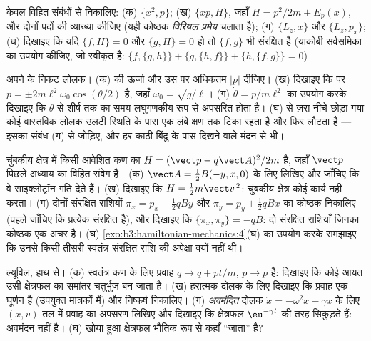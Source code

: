 \begin{exercise}[$\star$]\label{exo:b3:hamiltonian-mechanics:4}
केवल विहित संबंधों से निकालिए: (क) $\{x^2, p\}$; (ख)
$\{xp, H\}$, जहाँ $H = p^2/2m + E_p(x)$, और दोनों पदों की व्याख्या
कीजिए (यही कोष्ठक \emph{विरियल प्रमेय} चलाता है); (ग) $\{L_z, x\}$ और
$\{L_z, p_x\}$; (घ) दिखाइए कि यदि $\{f, H\} = 0$ और $\{g, H\} = 0$ हो
तो $\{f, g\}$ भी संरक्षित है (याकोबी सर्वसमिका का उपयोग कीजिए, जो
स्वीकृत है: $\{f,\{g,h\}\} + \{g,\{h,f\}\} + \{h,\{f,g\}\} = 0$)।
\end{exercise}

\begin{exercise}[$\star\star$]\label{exo:b3:hamiltonian-mechanics:5}
अपने  के निकट लोलक। (क)  की ऊर्जा और उस पर
अधिकतम $|p|$ दीजिए। (ख) दिखाइए कि  पर $p =
\pm 2m\ell^2\omega_0\cos(\theta/2)$ है, जहाँ $\omega_0 = \sqrt{g/\ell}$।
(ग) $\dot\theta = p/m\ell^2$ का उपयोग करके दिखाइए कि $\theta$ से शीर्ष
तक का समय लघुगणकीय रूप से अपसरित होता है। (घ)  से ज़रा
नीचे छोड़ा गया कोई वास्तविक लोलक उलटी स्थिति के पास एक लंबे क्षण तक
टिका रहता है और फिर लौटता है --- इसका संबंध (ग) से जोड़िए, और हर काठी
बिंदु के पास दिखने वाले मंदन से भी।
\end{exercise}

\begin{exercise}[$\star\star$]\label{exo:b3:hamiltonian-mechanics:6}
चुंबकीय क्षेत्र में किसी आवेशित कण का $H = (\vect p -
q\vect A)^2/2m$ है, जहाँ $\vect p$ पिछले अध्याय का विहित संवेग है।
(क) $\vect A = \tfrac12
B(-y, x, 0)$ के लिए  लिखिए और जाँचिए कि वे साइक्लोट्रॉन
गति देते हैं। (ख) दिखाइए कि $H =
\tfrac12 m\vect v^{\,2}$: चुंबकीय क्षेत्र कोई कार्य नहीं करता। (ग)
दोनों संरक्षित राशियों $\pi_x = p_x - \tfrac12
qBy$ और $\pi_y = p_y + \tfrac12 qBx$ का कोष्ठक निकालिए (पहले जाँचिए
कि प्रत्येक संरक्षित है), और दिखाइए कि $\{\pi_x, \pi_y\} = -qB$: दो
संरक्षित राशियाँ जिनका कोष्ठक एक अचर है। (घ)
\cref{exo:b3:hamiltonian-mechanics:4}(घ) का उपयोग करके समझाइए कि उनसे
किसी तीसरी स्वतंत्र संरक्षित राशि की अपेक्षा क्यों नहीं थी।
\end{exercise}

\begin{exercise}[$\star\star$]\label{exo:b3:hamiltonian-mechanics:7}
ल्यूविल, हाथ से। (क) स्वतंत्र कण के लिए प्रवाह $q \to q +
pt/m$, $p \to p$ है: दिखाइए कि कोई आयत उसी क्षेत्रफल का
समांतर चतुर्भुज बन जाता है। (ख) हरात्मक दोलक के लिए दिखाइए कि प्रवाह
एक घूर्णन है (उपयुक्त मात्रकों में) और निष्कर्ष निकालिए। (ग)
\emph{अवमंदित} दोलक $\ddot x = -\omega^2x - \gamma\dot x$ के लिए
$(x, v)$ तल में प्रवाह का अपसरण लिखिए और दिखाइए कि क्षेत्रफल
$\eu^{-\gamma t}$ की तरह सिकुड़ते हैं: अवमंदन
 नहीं है। (घ) खोया हुआ क्षेत्रफल भौतिक रूप से कहाँ ``जाता'' है?
\end{exercise}

